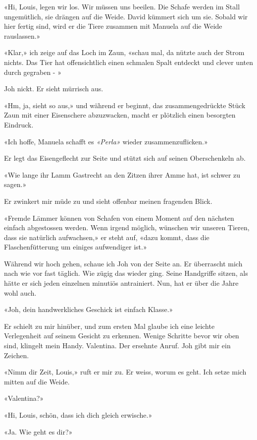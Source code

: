 «Hi, Louis, legen wir los. Wir müssen uns beeilen. Die Schafe werden im
Stall ungemütlich, sie drängen auf die Weide. David kümmert sich um sie.
Sobald wir hier fertig sind, wird er die Tiere zusammen mit Manuela auf
die Weide rauslassen.»

«Klar,» ich zeige auf das Loch im Zaun, «schau mal, da nützte auch der
Strom nichts. Das Tier hat offensichtlich einen schmalen Spalt entdeckt
und clever unten durch gegraben - »

Joh nickt. Er sieht mürrisch aus.

«Hm, ja, sieht so aus,» und während er beginnt, das zusammengedrückte
Stück Zaun mit einer Eisenschere abzuzwacken, macht er plötzlich einen besorgten Eindruck.

«Ich hoffe, Manuela schafft es \emph{«Perla»} wieder
zusammenzuflicken.»

Er legt das Eisengeflecht zur Seite und stützt sich auf seinen
Oberschenkeln ab.

«Wie lange ihr Lamm Gastrecht an den Zitzen ihrer Amme hat, ist schwer
zu sagen.»

Er zwinkert mir müde zu und sieht offenbar meinen fragenden Blick.

«Fremde Lämmer können von Schafen von einem Moment auf den nächsten
einfach abgestossen werden. Wenn irgend möglich, wünschen wir unseren
Tieren, dass sie natürlich aufwachsen,» er steht auf, «dazu kommt, dass
die Flaschenfütterung um einiges aufwendiger ist.»

\sectionbreak

Während wir hoch gehen, schaue ich Joh von der Seite an. Er überrascht
mich nach wie vor fast täglich. Wie zügig das wieder ging. Seine
Handgriffe sitzen, als hätte er sich jeden einzelnen minutiös
antrainiert. Nun, hat er über die Jahre wohl auch.

«Joh, dein handwerkliches Geschick ist einfach Klasse.»

Er schielt zu mir hinüber, und zum ersten Mal glaube ich eine leichte
Verlegenheit auf seinem Gesicht zu erkennen. 
Wenige Schritte bevor wir oben sind, klingelt mein Handy. Valentina. Der
ersehnte Anruf. Joh gibt mir ein Zeichen.

«Nimm dir Zeit, Louis,» ruft er mir zu. Er weiss, worum es geht. Ich
setze mich mitten auf die Weide.

«Valentina?»

«Hi, Louis, schön, dass ich dich gleich erwische.»

«Ja. Wie geht es dir?»


